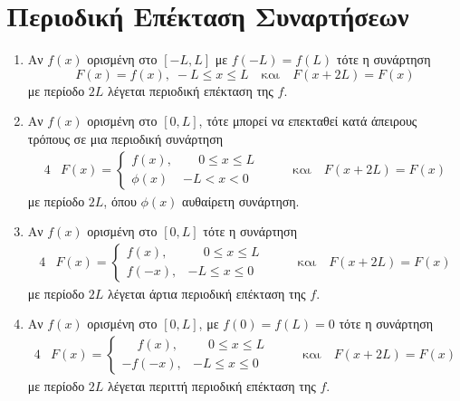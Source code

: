 \section{Περιοδική Επέκταση Συναρτήσεων}

\vspace{\baselineskip}

\begin{enumerate}

    \item Αν $ f(x) $ ορισμένη στο $ [-L,L] $ με $ f(-L)=f(L) $ τότε η συνάρτηση
        \[
            F(x) = f(x), \; -L \leq x \leq L \quad \text{και} \quad F(x+2L)=F(x)
        \]
        με περίοδο $ 2L $ λέγεται \textcolor{Col1}{περιοδική επέκταση} της $f$. 

    \item Αν $ f(x) $ ορισμένη στο $ [0,L] $, τότε μπορεί να επεκταθεί 
        κατά άπειρους τρόπους σε μια περιοδική συνάρτηση 
        \begin{alignat*}{4}
            &F(x) = 
            \begin{cases}  
                f(x), & \phantom{-} 0 \leq x \leq L \\
                \phi(x) & -L < x < 0
            \end{cases}  & \quad & \text{και} \quad F(x+2L)=F(x)
        \end{alignat*}
        με περίοδο $ 2L $, όπου $ \phi(x) $ αυθαίρετη συνάρτηση. 

    \item \label{artia} Αν $ f(x) $ ορισμένη στο $ [0,L] $ τότε η συνάρτηση 
        \begin{alignat*}{4}
            &F(x) = 
            \begin{cases}  
                f(x), & \phantom{-} 0 \leq x \leq L \\
                f(-x), & -L \leq x \leq 0
            \end{cases}  & \quad & \text{και} \quad F(x+2L)=F(x)
        \end{alignat*}
        με περίοδο $ 2L $ λέγεται \textcolor{Col1}{άρτια περιοδική επέκταση} της $f$.

    \item \label{peritth} Αν $ f(x) $ ορισμένη στο $ [0,L] $, με $ f(0)=f(L)=0 $ 
        τότε η συνάρτηση
        \begin{alignat*}{4}
            &F(x) = 
            \begin{cases}  
                \phantom{-} f(x), & \phantom{-} 0 \leq x \leq L \\
                -f(-x), & -L \leq x \leq 0
            \end{cases}  & \quad & \text{και} \quad F(x+2L)=F(x)
        \end{alignat*}
        με περίοδο $ 2L $ λέγεται \textcolor{Col1}{περιττή περιοδική επέκταση} της $f$.


\end{enumerate}
